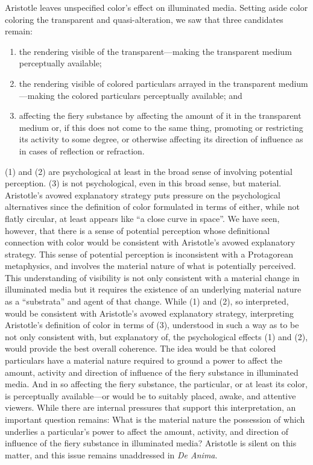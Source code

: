 Aristotle leaves unspecified color's effect on illuminated media. Setting aside color coloring the transparent and quasi-alteration, we saw that three candidates remain:
\begin{enumerate}[(1)]
	\item the rendering visible of the transparent---making the transparent medium perceptually available;
	\item the rendering visible of colored particulars arrayed in the transparent medi\-um\----\-making the colored particulars perceptually available; and
	\item affecting the fiery substance by affecting the amount of it in the transparent medium or, if this does not come to the same thing, promoting or restricting its activity to some degree, or otherwise affecting its direction of influence as in cases of reflection or refraction. 
\end{enumerate}
(1) and (2) are psychological at least in the broad sense of involving potential perception. (3) is not psychological, even in this broad sense, but material. Aristotle's avowed explanatory strategy puts pressure on the psychological alternatives since the definition of color formulated in terms of either, while not flatly circular, at least appears like ``a close curve in space''. We have seen, however, that there is a sense of potential perception whose definitional connection with color would be consistent with Aristotle's avowed explanatory strategy. This sense of potential perception is inconsistent with a Protagorean metaphysics, and involves the material nature of what is potentially perceived. This understanding of visibility is not only consistent with a material change in illuminated media but it requires the existence of an underlying material nature as a ``substrata'' and agent of that change. While (1) and (2), so interpreted, would be consistent with Aristotle's avowed explanatory strategy, interpreting Aristotle's definition of color in terms of (3), understood in such a way as to be not only consistent with, but explanatory of, the psychological effects (1) and (2), would provide the best overall coherence. The idea would be that colored particulars have a material nature required to ground a power to affect the amount, activity and direction of influence of the fiery substance in illuminated media. And in so affecting the fiery substance, the particular, or at least its color, is perceptually available---or would be to suitably placed, awake, and attentive viewers. While there are internal pressures that support this interpretation, an important question remains: What is the material nature the possession of which underlies a particular's power to affect the amount, activity, and direction of influence of the fiery substance in illuminated media?  Aristotle is silent on this matter, and this issue remains unaddressed in \emph{De Anima}. 

